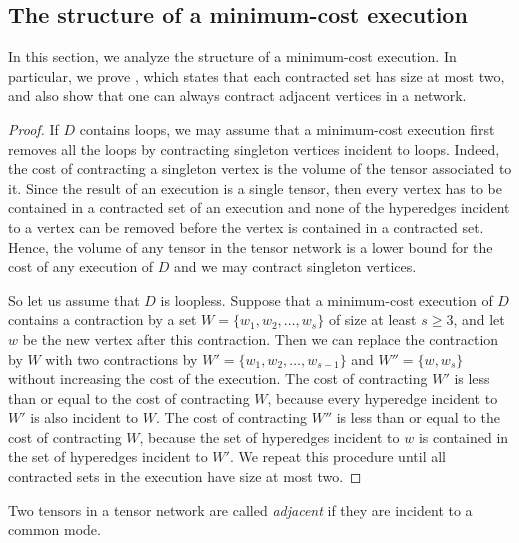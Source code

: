 \subsection{The structure of a minimum-cost execution} \label{sect:structure_min_cost_execution}

In this section, we analyze the structure of a minimum-cost execution. In particular, we prove , which states that each contracted set has size at most two, and also show that one can always contract adjacent vertices in a network.

\BinaryExecutionLemma* \label{lem:binary_appendix}

\begin{proof}
If $D$ contains loops, we may assume that
a minimum-cost execution first removes all the loops by contracting singleton
vertices incident to loops. Indeed, the cost of contracting
a singleton vertex is the volume of the tensor associated to it. Since the result of an execution is a single tensor, then every vertex has to be contained in a contracted set of an execution and none of the hyperedges incident to a vertex can be removed before the vertex is contained in a contracted set. Hence, the volume of any tensor in the tensor network is a lower
bound for the cost of any execution of $D$ and we may contract singleton vertices.

So let us assume that $D$ is loopless.
Suppose that a minimum-cost execution of $D$ contains a contraction by
a set $W=\{w_1,w_2,\ldots,w_s\}$ of size at least $s\geq 3$, and let $w$ be the new vertex after this contraction. Then we can replace the contraction by $W$ with
two contractions by $W'=\{w_1,w_2,\ldots,w_{s-1}\}$ and $W''=\{w,w_s\}$ without increasing the
cost of the execution. The cost of contracting $W'$ is less than or equal to the cost of contracting $W$, because every hyperedge incident to $W'$ is also incident to $W$. The cost of contracting $W''$ is less than or equal to the cost of contracting $W$, because the set of hyperedges incident to $w$ is contained in the set of hyperedges incident to $W'$. We repeat this procedure until all contracted sets in the
execution have size at most two.
\end{proof}

Two tensors in a tensor network are called \emph{adjacent}
if they are incident to a common mode.

